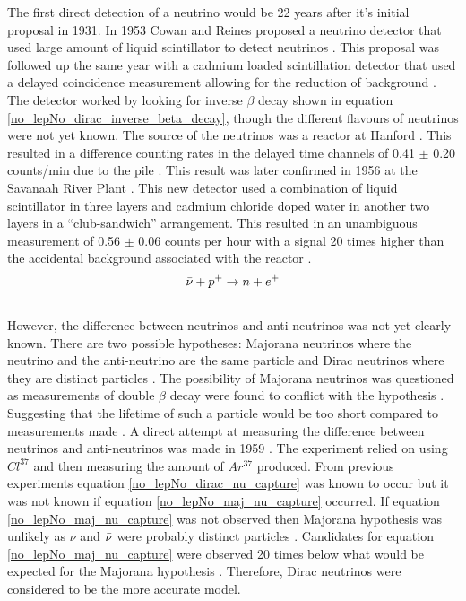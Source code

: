 \documentclass[12pt,a4paper]{article}
\begin{document}
The first direct detection of a neutrino would be 22 years after it's initial proposal in 1931. In 1953 Cowan and Reines proposed a neutrino detector that used large amount of liquid scintillator to detect neutrinos \cite{reines1953proposed}. This proposal was followed up the same year with a cadmium loaded scintillation detector that used a delayed coincidence measurement allowing for the reduction of background \cite{reines1953proposed} \cite{reines1953detection}. The detector worked by looking for inverse $\beta$ decay shown in equation \ref{no_lepNo_dirac_inverse_beta_decay}, though the different flavours of neutrinos were not yet known. The source of the neutrinos was a reactor at Hanford \cite{reines1953detection}. This resulted in a difference counting rates in the delayed time channels of 0.41 $\pm$ 0.20 counts/min due to the pile \cite{reines1953detection}. This result was later confirmed in 1956 at the Savanaah River Plant \cite{Cowan1956Confirmation}. This new detector used a combination of liquid scintillator in three layers and cadmium chloride doped water in another two layers in a ``club-sandwich'' arrangement. This resulted in an unambiguous measurement of 0.56 $\pm$ 0.06 counts per hour with a signal 20 times higher than the accidental background associated with the reactor \cite{Cowan1956Confirmation}. 
\begin{equation}
    \Bar{\nu} + p^+ \rightarrow n + e^+
    \label{no_lepNo_dirac_inverse_beta_decay}
\end{equation}
\\However, the difference between neutrinos and anti-neutrinos was not yet clearly known. There are two possible hypotheses: Majorana neutrinos where the neutrino and the anti-neutrino are the same particle and Dirac neutrinos where they are distinct particles \cite{griffiths2008introduction} \cite{cowan1957test}. The possibility of Majorana neutrinos was questioned as measurements of double $\beta$ decay were found to conflict with the hypothesis \cite{cowan1957test}. Suggesting that the lifetime of such a particle would be too short compared to measurements made \cite{cowan1957test}. A direct attempt at measuring the difference between neutrinos and anti-neutrinos was made in 1959 \cite{davis1959attempt}. The experiment relied on using $Cl^{37}$ and then measuring the amount of $Ar^{37}$ produced. From previous experiments \cite{Cowan1956Confirmation} equation \ref{no_lepNo_dirac_nu_capture} was known to occur but it was not known if equation \ref{no_lepNo_maj_nu_capture} occurred. If equation \ref{no_lepNo_maj_nu_capture} was not observed then Majorana hypothesis was unlikely as $\nu$ and $\Bar{\nu}$ were probably distinct particles \cite{griffiths2008introduction} \cite{davis1959attempt}. Candidates for equation \ref{no_lepNo_maj_nu_capture} were observed 20 times below what would be expected for the Majorana hypothesis \cite{davis1959attempt}. Therefore, Dirac neutrinos were considered to be the more accurate model. 
\end{document}
